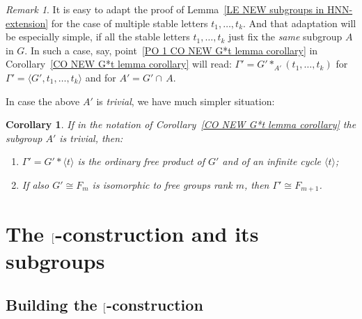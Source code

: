 \documentclass[12pt, a4paper]{amsart}
\newcommand{\1}{\{1\}}
\newcommand{\bigast}{\textrm{\footnotesize\ding{91}}}
\theoremstyle{plain}
\newtheorem{Corollary}[Theorem]{Corollary}
\theoremstyle{definition}
\theoremstyle{remark}
\newtheorem{Remark}[Theorem]{Remark}
\numberwithin{equation}{section}
\begin{document}
\begin{Remark} 
\label{RE about multiple stable letters}
It is easy to adapt the proof of Lemma~\ref{LE NEW subgroups in HNN-extension} for the case of multiple stable letters $t_1, \ldots, t_k$. And that adaptation will be especially simple, if all the stable letters $t_1, \ldots, t_k$ just fix the \textit{same} subgroup $A$ in $G$. In such a case, say, point~\eqref{PO 1 CO NEW G*t lemma corollary} in Corollary~\ref{CO NEW G*t lemma corollary} will read: 
$\Gamma'= G' \!*_{A'} (t_1, \ldots, t_k)$ for $\Gamma'=\langle G', t_1, \ldots, t_k\rangle$ and for $A' = G' \cap\, A$. 
\end{Remark} 




In case the above $A'$  is \textit{trivial}, we have much simpler situation:

\begin{Corollary} 
\label{CO NEW G*t lemma corollary case A'=1}
If in the notation of Corollary~\ref{CO NEW G*t lemma corollary} the subgroup $A'$ is trivial, then:

\begin{enumerate}

\item 
\label{PO 1 CO NEW G*t lemma corollary case A'=1}
$\Gamma'= G' *\langle t \rangle$ is the ordinary free product of $G'$ and of an infinite cycle $\langle t \rangle$;

\item 
\label{PO 2 CO NEW G*t lemma corollary case A'=1}
If also 
$G'\cong F_m$ is isomorphic to free groups rank $m$, then $\Gamma' \cong F_{m+1}$.

\end{enumerate}
\end{Corollary}




\section{The $\bigast$-construction and its subgroups}
\label{SU The star construction}

\subsection{Building the $\bigast$-construction}
\label{SU Building the *-construction} 
\end{document}
